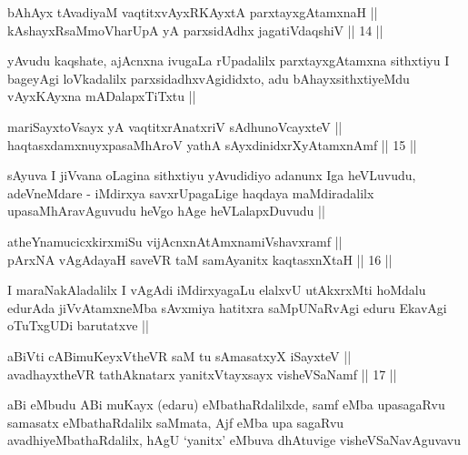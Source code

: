 
\begin{shl}
bAhAyx tAvadiyaM vaqtitxvAyxRKAyxtA parxtayxgAtamxnaH || \\
kAshayxRsaMmoVharUpA yA parxsidAdhx jagatiVdaqshiV ||  14 ||  
\end{shl}

\begin{artha}
yAvudu kaqshate, ajAcnxna ivugaLa rUpadalilx parxtayxgAtamxna
sithxtiyu I bageyAgi loVkadalilx parxsidadhxvAgididxto, adu
bAhayxsithxtiyeMdu vAyxKAyxna mADalapxTiTxtu ||
\end{artha}


\begin{shl}
mariSayxtoV\s sayx yA vaqtitxrAnatxriV sA\s dhunoVcayxteV ||  \\
haqtasxdamxnuyxpasaMhAroV yathA sAyxdinidxrXyAtamxnAmf ||  15 ||  
\end{shl}

\begin{artha}
sAyuva I jiVvana oLagina sithxtiyu yAvudidiyo adanunx Iga heVLuvudu,
adeVneMdare - iMdirxya savxrUpagaLige haqdaya maMdiradalilx
upasaMhAravAguvudu heVgo hAge heVLalapxDuvudu ||
\end{artha}


\begin{shl}
atheYnamucicxkirxmiSu vijAcnxnAtAmxnamiVshavxramf || \\
pArxNA vAgAdayaH saveVR taM samAyanitx kaqtasxnXtaH ||  16 ||  
\end{shl}

\begin{artha}
I maraNakAladalilx I vAgAdi iMdirxyagaLu elalxvU utAkxrxMti hoMdalu
edurAda jiVvAtamxneMba sAvxmiya hatitxra saMpUNaRvAgi eduru EkavAgi
oTuTxgUDi barutatxve ||
\end{artha}


\begin{shl}
aBiVti cA\s \s BimuKeyxV\s theVR saM tu sAmasatxyX iSayxteV ||  \\
avadhayxtheVR tathA\s \s knatarx yanitxVtayxsayx visheVSaNamf ||  17 || 
\end{shl}

\begin{artha}
aBi eMbudu ABi muKayx (edaru) eMbathaRdalilxde, samf eMba upasagaRvu
samasatx eMbathaRdalilx saMmata, Ajf eMba upa sagaRvu
avadhiyeMbathaRdalilx, hAgU `yanitx' eMbuva dhAtuvige visheVSaNavAguvavu
\end{artha}

